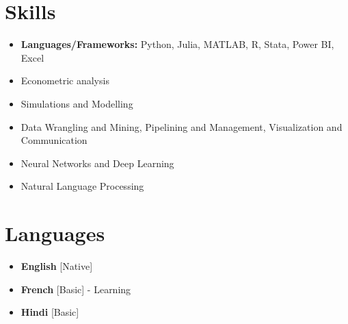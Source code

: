 \documentclass[11pt,a4paper,sans]{moderncv}
\begin{document}
\section{Skills}
{\begin{itemize}[label=\textbullet]
\item {\textbf{Languages/Frameworks:} Python, Julia, MATLAB, R, Stata, Power BI, Excel}
\item Econometric analysis
\item Simulations and Modelling
\item Data Wrangling and Mining, Pipelining and Management, Visualization and Communication
\item Neural Networks and Deep Learning
\item Natural Language Processing
\end{itemize}}

\section{Languages}
\begin{multicols}{2}
    \begin{itemize}[label=\textbullet]
    \item \textbf{English} [Native]
    \item {\textbf{French} [Basic] - Learning}
    \item {\textbf{Hindi} [Basic]}
    \end{itemize}
\end{multicols}
\end{document}
